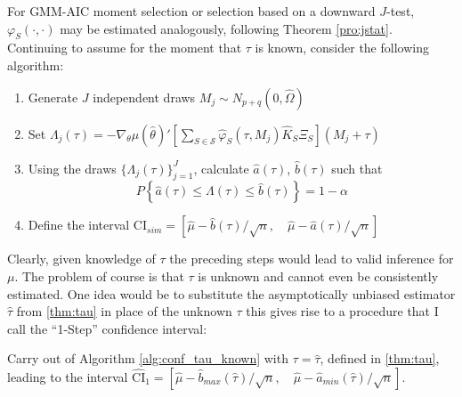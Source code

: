 For GMM-AIC moment selection or selection based on a downward $J$-test, $\varphi_S(\cdot,\cdot)$ may be estimated analogously, following  Theorem \ref{pro:jstat}. 
Continuing to assume for the moment that $\tau$ is known, consider the following algorithm:
\begin{alg}
\mbox{}
		\begin{enumerate}
\label{alg:conf_tau_known}
			\item Generate $J$ independent draws $M_j \sim N_{p+q}( 0, \widehat{\Omega} )$
			\item Set $\Lambda_j(\tau) = -\nabla_\theta\mu(\widehat{\theta})'\left[\sum_{S \in \mathscr{S}} \widehat{\varphi}_S(\tau,M_j) \widehat{K}_S\Xi_S\right] (M_j + \tau)$
			\item Using the draws $\{\Lambda_j(\tau)\}_{j=1}^J$, calculate $\widehat{a}(\tau)$, $\widehat{b}(\tau)$ such that
		$$P\left\{ \widehat{a}(\tau) \leq\Lambda(\tau)\leq \widehat{b}(\tau) \right\} = 1 - \alpha$$
  \item Define the interval 
    $ \mbox{CI}_{sim}=\left[ \widehat{\mu} - \widehat{b}(\tau)/\sqrt{n}, \quad \widehat{\mu} - \widehat{a}(\tau)/\sqrt{n} \right]$
		\end{enumerate}
\end{alg}

Clearly, given knowledge of $\tau$ the preceding steps would lead to valid inference for $\mu$.
The problem of course is that $\tau$ is unknown and cannot even be consistently estimated.
One idea would be to substitute the asymptotically unbiased estimator $\widehat{\tau}$ from \ref{thm:tau} in place of the unknown $\tau$ this gives rise to a procedure that I call the ``1-Step'' confidence interval:
\begin{alg} 
Carry out of Algorithm \ref{alg:conf_tau_known} with $\tau = \widehat{\tau}$, defined in \ref{thm:tau}, leading to the interval
$ \widehat{\mbox{CI}}_{1}=\left[ \widehat{\mu} - \widehat{b}_{max}(\widehat{\tau})/\sqrt{n}, \quad \widehat{\mu} - \widehat{a}_{min}(\widehat{\tau})/\sqrt{n} \right]$.
\end{alg}


